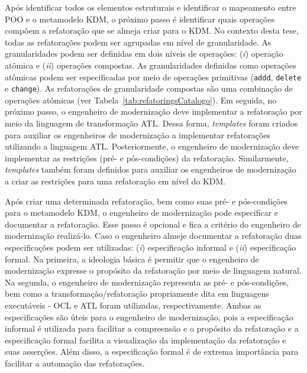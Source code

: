 Após identificar todos os elementos estruturais e identificar o mapeamento entre POO e o metamodelo KDM, o próximo passo é identificar quais operações compõem a refatoração que se almeja criar para o KDM. No contexto desta tese, todas as refatorações podem ser agrupadas em nível de granularidade. As granularidades podem ser definidas em dois níveis de operações: (\textit{i}) operação atômica e (\textit{ii}) operações compostas. As granularidades definidas como operações atômicas podem ser especificadas por meio de operações primitivas (\texttt{addd}, \texttt{delete} e \texttt{change}). As refatorações de granularidade compostas são uma combinação de operações atômicas (ver Tabela~\ref{tab:refatoringsCatalogo}). Em seguida, no próximo passo, o engenheiro de modernização deve implementar a refatoração por meio da linguagem de transformação ATL. Dessa forma, \textit{templates} foram criados para auxiliar os engenheiros de modernização a implementar refatorações utilizando a linguagem ATL. Posteriormente, o engenheiro de modernização deve implementar as restrições (pré- e pós-condições) da refatoração. Similarmente, \textit{templates} também foram definidos para auxiliar os engenheiros de modernização a criar as restrições para uma refatoração em nível do KDM.

Após criar uma determinada refatoração, bem como suas pré- e pós-condições para o metamodelo KDM, o engenheiro de modernização pode especificar e documentar a refatoração. Esse passo é opcional e fica a critério do engenheiro de modernização realizá-lo. Caso o engenheiro almeje documentar a refatoração duas especificações podem ser utilizadas: (\textit{i}) especificação informal e (\textit{ii}) especificação formal. Na primeira, a ideologia básica é permitir que o engenheiro de modernização expresse o propósito da refatoração por meio de linguagem natural. Na segunda, o engenheiro de modernização representa as pré- e pós-condições, bem como a transformação/refatoração propriamente dita em linguagens executáveis - OCL e ATL foram utilizadas, respectivamente. Ambas as especificações são úteis para o engenheiro de modernização, pois a especificação informal é utilizada para facilitar a compreensão e o propósito da refatoração e a especificação formal facilita a visualização da implementação da refatoração e suas asserções. Além disso, a especificação formal é de extrema importância para facilitar a automação das refatorações. %

